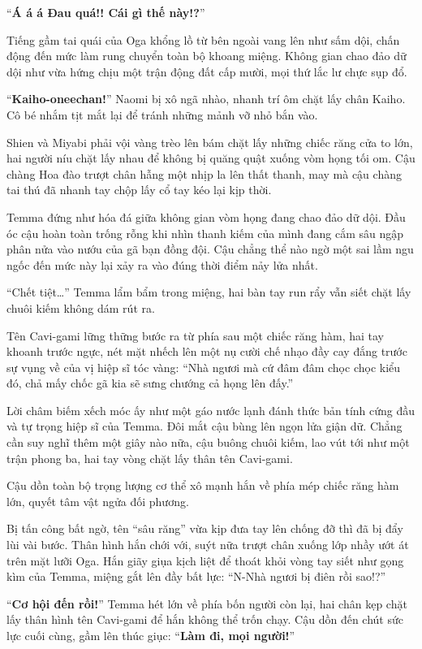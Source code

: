 \documentclass[../main.tex]{subfiles}
\begin{document}
``\textbf{Á á á Đau quá!! Cái gì thế này!?}''

Tiếng gầm tai quái của Oga khổng lồ từ bên ngoài vang lên như sấm dội, chấn động đến mức làm rung chuyển toàn bộ khoang miệng. Không gian chao đảo dữ dội như vừa hứng chịu một trận động đất cấp mười, mọi thứ lắc lư chực sụp đổ.

``\textbf{Kaiho-oneechan!}'' Naomi bị xô ngã nhào, nhanh trí ôm chặt lấy chân Kaiho. Cô bé nhắm tịt mắt lại để tránh những mảnh vỡ nhỏ bắn vào.

Shien và Miyabi phải vội vàng trèo lên bám chặt lấy những chiếc răng cửa to lớn, hai người níu chặt lấy nhau để không bị quăng quật xuống vòm họng tối om. Cậu chàng Hoa đào trượt chân hẫng một nhịp la lên thất thanh, may mà cậu chàng tai thú đã nhanh tay chộp lấy cổ tay kéo lại kịp thời.

Temma đứng như hóa đá giữa không gian vòm họng đang chao đảo dữ dội. Đầu óc cậu hoàn toàn trống rỗng khi nhìn thanh kiếm của mình đang cắm sâu ngập phân nửa vào nướu của gã bạn đồng đội. Cậu chẳng thể nào ngờ một sai lầm ngu ngốc đến mức này lại xảy ra vào đúng thời điểm nảy lửa nhất.

``Chết tiệt\dots'' Temma lẩm bẩm trong miệng, hai bàn tay run rẩy vẫn siết chặt lấy chuôi kiếm không dám rút ra.

Tên Cavi-gami lững thững bước ra từ phía sau một chiếc răng hàm, hai tay khoanh trước ngực, nét mặt nhếch lên một nụ cười chế nhạo đầy cay đắng trước sự vụng về của vị hiệp sĩ tóc vàng: ``Nhà ngươi mà cứ đâm đâm chọc chọc kiểu đó, chả mấy chốc gã kia sẽ sưng chướng cả họng lên đấy.''

Lời châm biếm xếch móc ấy như một gáo nước lạnh đánh thức bản tính cứng đầu và tự trọng hiệp sĩ của Temma. Đôi mắt cậu bùng lên ngọn lửa giận dữ. Chẳng cần suy nghĩ thêm một giây nào nữa, cậu buông chuôi kiếm, lao vút tới như một trận phong ba, hai tay vòng chặt lấy thân tên Cavi-gami.

Cậu dồn toàn bộ trọng lượng cơ thể xô mạnh hắn về phía mép chiếc răng hàm lớn, quyết tâm vật ngửa đối phương.

Bị tấn công bất ngờ, tên ``sâu răng'' vừa kịp đưa tay lên chống đỡ thì đã bị đẩy lùi vài bước. Thân hình hắn chới với, suýt nữa trượt chân xuống lớp nhầy ướt át trên mặt lưỡi Oga. Hắn giãy giụa kịch liệt để thoát khỏi vòng tay siết như gọng kìm của Temma, miệng gắt lên đầy bất lực: ``N-Nhà ngươi bị điên rồi sao!?''

``\textbf{Cơ hội đến rồi!}'' Temma hét lớn về phía bốn người còn lại, hai chân kẹp chặt lấy thân hình tên Cavi-gami để hắn không thể trốn chạy. Cậu dồn đến chút sức lực cuối cùng, gầm lên thúc giục: ``\textbf{Làm đi, mọi người!}''
\end{document}
